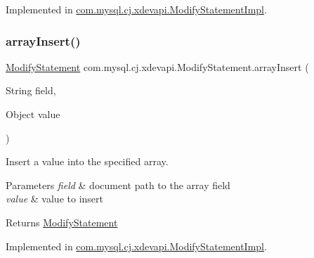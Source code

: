 Implemented in \mbox{\hyperlink{classcom_1_1mysql_1_1cj_1_1xdevapi_1_1_modify_statement_impl_ac765892bc25e09147fa11c5171a9287b}{com.\+mysql.\+cj.\+xdevapi.\+Modify\+Statement\+Impl}}.

\mbox{\label{interfacecom_1_1mysql_1_1cj_1_1xdevapi_1_1_modify_statement_ac2c03d79835985d8b8771aee0945aea8}} 
\subsubsection{\texorpdfstring{array\+Insert()}{arrayInsert()}}
{\footnotesize\ttfamily \mbox{\hyperlink{interfacecom_1_1mysql_1_1cj_1_1xdevapi_1_1_modify_statement}{Modify\+Statement}} com.\+mysql.\+cj.\+xdevapi.\+Modify\+Statement.\+array\+Insert (\begin{DoxyParamCaption}\item[{String}]{field,  }\item[{Object}]{value }\end{DoxyParamCaption})}

Insert a value into the specified array.


\begin{DoxyParams}{Parameters}
{\em field} & document path to the array field \\
\hline
{\em value} & value to insert \\
\hline
\end{DoxyParams}
\begin{DoxyReturn}{Returns}
\mbox{\hyperlink{interfacecom_1_1mysql_1_1cj_1_1xdevapi_1_1_modify_statement}{Modify\+Statement}} 
\end{DoxyReturn}


Implemented in \mbox{\hyperlink{classcom_1_1mysql_1_1cj_1_1xdevapi_1_1_modify_statement_impl_a902a626ef8ba98170a0653ca3799c0c8}{com.\+mysql.\+cj.\+xdevapi.\+Modify\+Statement\+Impl}}.

\mbox{\label{interfacecom_1_1mysql_1_1cj_1_1xdevapi_1_1_modify_statement_acb3745c970e50cf538e8d9b2295a08e1}} 
